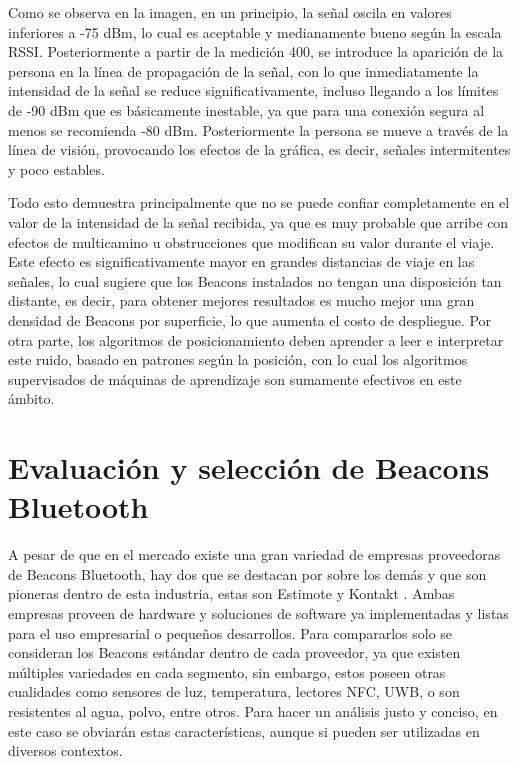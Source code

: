 Como se observa en la imagen, en un principio, la señal oscila en valores inferiores a -75 dBm, lo cual es aceptable y medianamente bueno según la escala RSSI. Posteriormente a partir de la medición 400, se introduce la aparición de la persona en la línea de propagación de la señal, con lo que inmediatamente la intensidad de la señal se reduce significativamente, incluso llegando a los límites de -90 dBm que es básicamente inestable, ya que para una conexión segura al menos se recomienda -80 dBm. Posteriormente la persona se mueve a través de la línea de visión, provocando los efectos de la gráfica, es decir, señales intermitentes y poco estables.

Todo esto demuestra principalmente que no se puede confiar completamente en el valor de la intensidad de la señal recibida, ya que es muy probable que arribe con efectos de multicamino u obstrucciones que modifican su valor durante el viaje. Este efecto es significativamente mayor en grandes distancias de viaje en las señales, lo cual sugiere que los Beacons instalados no tengan una disposición tan distante, es decir, para obtener mejores resultados es mucho mejor una gran densidad de Beacons por superficie, lo que aumenta el costo de despliegue. Por otra parte, los algoritmos de posicionamiento deben aprender a leer e interpretar este ruido, basado en patrones según la posición, con lo cual los algoritmos supervisados de máquinas de aprendizaje son sumamente efectivos en este ámbito.


\section{Evaluación y selección de Beacons Bluetooth}
\label{sec:seleccion}

A pesar de que en el mercado existe una gran variedad de empresas proveedoras de Beacons Bluetooth, hay dos que se destacan por sobre los demás y que son pioneras dentro de esta industria, estas son Estimote \citep{estimote} y Kontakt \citep{kontaktio}. Ambas empresas proveen de hardware y soluciones de software ya implementadas y listas para el uso empresarial o pequeños desarrollos. Para compararlos solo se consideran los Beacons estándar dentro de cada proveedor, ya que existen múltiples variedades en cada segmento, sin embargo, estos poseen otras cualidades como sensores de luz, temperatura, lectores NFC, UWB, o son resistentes al agua, polvo, entre otros. Para hacer un análisis justo y conciso, en este caso se obviarán estas características, aunque si pueden ser utilizadas en diversos contextos. 

